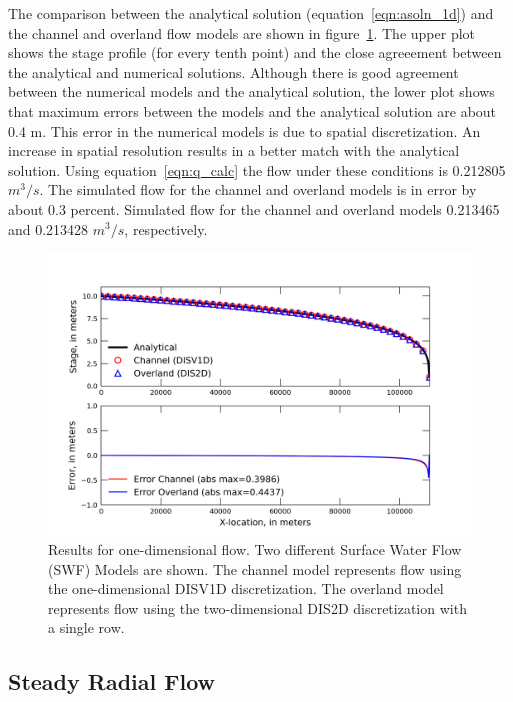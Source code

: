 \documentclass[fleqn]{article}
\begin{document}
The comparison between the analytical solution (equation~\ref{eqn:asoln_1d}) and the channel and overland flow models are shown in figure~\ref{fig:oned-results}.  The upper plot shows the stage profile (for every tenth point) and the close agreeement between the analytical and numerical solutions.  Although there is good agreement between the numerical models and the analytical solution, the lower plot shows that maximum errors between the models and the analytical solution are about 0.4 m.  This error in the numerical models is due to spatial discretization.  An increase in spatial resolution results in a better match with the analytical solution.  Using equation~\ref{eqn:q_calc} the flow under these conditions is 0.212805 $m^3/s$.  The simulated flow for the channel and overland models is in error by about 0.3 percent. Simulated flow for the channel and overland models 0.213465 and 0.213428 $m^3/s$, respectively.  

\begin{figure}[h!tbp]
	\centering
	\includegraphics[scale=1.0]{figures/oned.png}
	\caption[Results for one-dimensional flow.]{Results for one-dimensional flow.  Two different Surface Water Flow (SWF) Models are shown.  The channel model represents flow using the one-dimensional DISV1D discretization.  The overland model represents flow using the two-dimensional DIS2D discretization with a single row.}
	\label{fig:oned-results}
\end{figure}

\newpage
\subsection{Steady Radial Flow}
\end{document}
